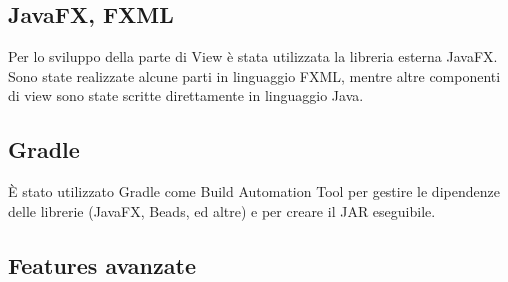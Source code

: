 \documentclass[a4paper,12pt]{report}
\begin{document}
\subsection{JavaFX, FXML}
Per lo sviluppo della parte di View è stata utilizzata la libreria esterna JavaFX.
Sono state realizzate alcune parti in linguaggio FXML, mentre altre componenti di view sono state scritte direttamente in linguaggio Java.
\subsection{Gradle}
È stato utilizzato Gradle come Build Automation Tool per gestire le dipendenze delle librerie (JavaFX, Beads, ed altre) e per creare il JAR eseguibile.
\endsubsection
\subsection{Features avanzate}
\end{document}
